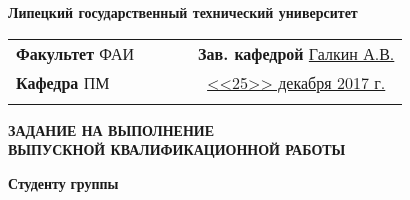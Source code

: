 \def\datavydachi{25.12.2017 г.} %
\def\datavydachiPr{<<25>> декабря 2017 г.} %
\def\datasdachi{25.05.2018 г.} %
\def\datadopuska{01.06.2018 г.} %


\pagestyle{empty}
\normalsize
\begin{center}
	\textbf{Липецкий государственный технический университет}
\end{center}

\noindent
\begin{tabular}{p{6cm} p{1cm} c p{1cm} c}
	\textbf{Факультет} ФАИ  &   &  &  & \textbf{Зав. кафедрой} \underline{Галкин А.В.}   \\ \hhline {~~~~~}
	\textbf{Кафедра} ПМ  &   &  &  & \underline{\hspace{2.5cm}\datavydachiPr}  \\ \hhline {~~~~~}
\end{tabular}

\begin{center}
	\textbf{ЗАДАНИЕ НА ВЫПОЛНЕНИЕ \\ ВЫПУСКНОЙ КВАЛИФИКАЦИОННОЙ РАБОТЫ}
\end{center} 

\noindent
\textbf{Студенту} \hspace{0.25cm} \studentDat \hspace{0.25cm} \textbf{группы} \group \\

\noindent



